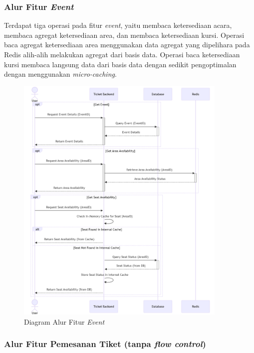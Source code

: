 \pagebreak

\subsubsection{Alur Fitur \textit{Event}}

Terdapat tiga operasi pada fitur \textit{event}, yaitu membaca ketersediaan acara, membaca agregat ketersediaan area, dan membaca ketersediaan kursi. Operasi baca agregat ketersediaan area menggunakan data agregat yang dipelihara pada Redis alih-alih melakukan agregat dari basis data. Operasi baca ketersediaan kursi membaca langsung data dari basis data dengan sedikit pengoptimalan dengan menggunakan \textit{micro-caching}.

\begin{figure}[h]
    \centering
    \includegraphics[width=0.9\textwidth]{resources/chapter-3/event-flow.png}
    \caption{Diagram Alur Fitur \textit{Event}}
    \label{fig:flow-event}
\end{figure}

\pagebreak

\subsubsection{Alur Fitur Pemesanan Tiket (tanpa \textit{flow control})}

